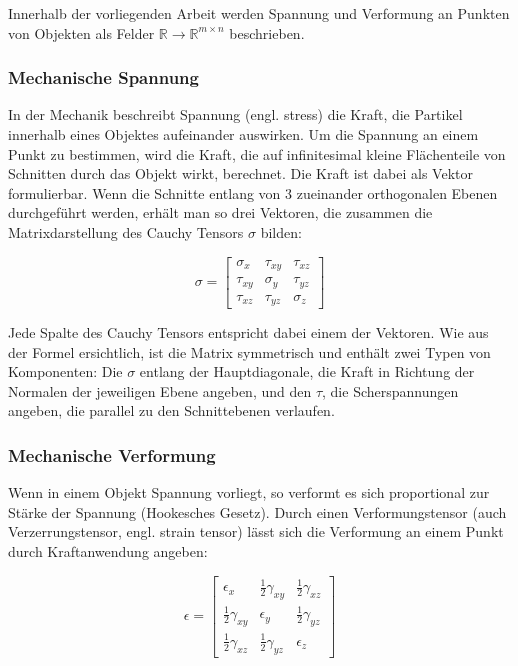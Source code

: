 \documentclass[a4paper,fontsize=12pt,toc=bib,halfparskip]{scrartcl}
\begin{document}
Innerhalb der vorliegenden Arbeit werden Spannung und Verformung an Punkten von Objekten als Felder $\mathbb{R} \rightarrow \mathbb{R}^{m\times n}$ beschrieben.

\subsubsection{Mechanische Spannung}
In der Mechanik beschreibt Spannung (engl. stress) die Kraft, die Partikel innerhalb eines Objektes aufeinander auswirken. Um die Spannung an einem Punkt zu bestimmen, wird die Kraft, die auf infinitesimal kleine Fl\"achenteile von Schnitten durch das Objekt wirkt, berechnet. Die Kraft ist dabei als Vektor formulierbar. Wenn die Schnitte entlang von 3 zueinander orthogonalen Ebenen durchgef\"uhrt werden, erh\"alt man so drei Vektoren, die zusammen die Matrixdarstellung des Cauchy Tensors $\sigma$ bilden:

\begin{equation}
	\sigma =  
	\begin{bmatrix}
		\sigma_x & \tau_{xy} & \tau_{xz}\\
		\tau_{xy} & \sigma_y & \tau_{yz}\\
		\tau_{xz} & \tau_{yz} & \sigma_z
	\end{bmatrix}
\end{equation}

Jede Spalte des Cauchy Tensors entspricht dabei einem der Vektoren. Wie aus der Formel ersichtlich, ist die Matrix symmetrisch und enth\"alt zwei Typen von Komponenten: Die $\sigma$ entlang der Hauptdiagonale, die Kraft in Richtung der Normalen der jeweiligen Ebene angeben, und den $\tau$, die Scherspannungen angeben, die parallel zu den Schnittebenen verlaufen. 

\subsubsection{Mechanische Verformung}
Wenn in einem Objekt Spannung vorliegt, so verformt es sich proportional zur St\"arke der Spannung (Hookesches Gesetz). Durch einen Verformungstensor (auch Verzerrungstensor, engl. strain tensor) l\"asst sich die Verformung an einem Punkt durch Kraftanwendung angeben:

\begin{equation}
	\epsilon =  
	\begin{bmatrix}
		\epsilon_x & \frac{1}{2}\gamma_{xy} & \frac{1}{2}\gamma_{xz}\\
		\frac{1}{2}\gamma_{xy} & \epsilon_y & \frac{1}{2}\gamma_{yz}\\
		\frac{1}{2}\gamma_{xz} & \frac{1}{2}\gamma_{yz} & \epsilon_z
	\end{bmatrix}
\end{equation}
\end{document}
